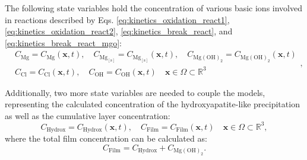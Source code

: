 The following state variables hold the concentration of various basic ions involved in reactions described by Eqs. \ref{eq:kinetics_oxidation_react1}, \ref{eq:kinetics_oxidation_react2}, \ref{eq:kinetics_break_react}, and \ref{eq:kinetics_break_react_mgo}:
\begin{equation} \label{eq:kinetics_state_vars_film}
\begin{aligned}
&C_{\mathrm{Mg}} = C_{\mathrm{Mg}}(\mathbf{x},t), \quad C_{\mathrm{Mg}_\mathrm{[s]}} = C_{\mathrm{Mg}_\mathrm{[s]}}(\mathbf{x},t), \quad C_{\mathrm{Mg}(\mathrm{OH})_{2}} = C_{\mathrm{Mg}(\mathrm{OH})_{2}}(\mathbf{x},t)  \\
&C_{\mathrm{Cl}} = C_{\mathrm{Cl}}(\mathbf{x},t), \quad C_{\mathrm{OH}} = C_{\mathrm{OH}}(\mathbf{x},t) \quad \mathbf{x} \in \Omega \subset \mathbb{R}^{3}
\end{aligned},
\end{equation}

Additionally, two more state variables are needed to couple the models, representing the calculated concentration of the hydroxyapatite-like precipitation as well as the cumulative layer concentration:
\begin{equation} \label{eq:kinetics_state_vars}
C_{\mathrm{Hydrox}} = C_{\mathrm{Hydrox}}(\mathbf{x},t), \quad C_{\mathrm{Film}} = C_{\mathrm{Film}}(\mathbf{x},t) \quad \mathbf{x} \in \Omega \subset \mathbb{R}^{3},
\end{equation}
where the total film concentration can be calculated as:
\begin{equation} \label{eq:kinetics_film_cumulative}
C_{\mathrm{Film}} = C_{\mathrm{Hydrox}} + C_{\mathrm{\mathrm{Mg}(\mathrm{OH})_{2}}}.
\end{equation}

